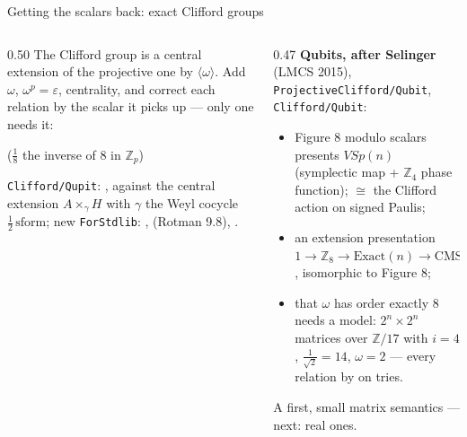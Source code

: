 \begin{frame}{Getting the scalars back: exact Clifford groups \New}
\begin{columns}[c]
\begin{column}{0.50\textwidth}
\small The Clifford group is a \alert{central extension} of the projective one by
$\langle\omega\rangle$. Add $\omega$, $\omega^p=\varepsilon$, centrality, and
\alert{correct} each relation by the scalar it picks up --- only one needs it:
\vspace{4pt}

\centering{}

{\scriptsize ($\frac18$ the inverse of 8 in $\mathbb{Z}_p$)}
\vspace{4pt}

\raggedright
\small \texttt{Clifford/Qupit}: , against the central
extension $A\times_\gamma H$ with $\gamma$ the Weyl cocycle $\frac12\,\text{sform}$;
new \texttt{ForStdlib}: , 
(Rotman 9.8), .
\end{column}
\begin{column}{0.47\textwidth}
\small \textbf{Qubits, after Selinger} (LMCS 2015), \texttt{ProjectiveClifford/Qubit},
\texttt{Clifford/Qubit}:
\begin{itemize}
  \item Figure 8 modulo scalars presents $V\!Sp(n)$ (symplectic map + $\mathbb{Z}_4$
        phase function); $\cong$ the Clifford action on signed Paulis;
  \item an \alert{extension} presentation $1\to\mathbb{Z}_8\to\text{Exact}(n)\to
        \text{CMS}(n)\to1$, isomorphic to Figure 8;
  \item that $\omega$ has order exactly 8 needs a model: $2^n\times2^n$
        matrices over $\mathbb{Z}/17$ with $i=4$, $\frac1{\sqrt2}=14$,
        $\omega=2$ --- every relation by  on tries.
\end{itemize}
\begin{newdevbox}
\small A first, small \alert{matrix} semantics --- next: real ones.
\end{newdevbox}
\end{column}
\end{columns}
\end{frame}
